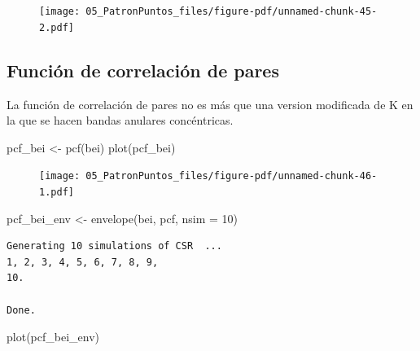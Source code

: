 \documentclass[
  letterpaper,
  DIV=11,
  numbers=noendperiod]{scrreprt}
\newenvironment{Shaded}{\begin{snugshade}}{\end{snugshade}}
\newcommand{\AttributeTok}[1]{\textcolor[rgb]{0.40,0.45,0.13}{#1}}
\newcommand{\DecValTok}[1]{\textcolor[rgb]{0.68,0.00,0.00}{#1}}
\newcommand{\FunctionTok}[1]{\textcolor[rgb]{0.28,0.35,0.67}{#1}}
\newcommand{\NormalTok}[1]{\textcolor[rgb]{0.00,0.23,0.31}{#1}}
\newcommand{\OtherTok}[1]{\textcolor[rgb]{0.00,0.23,0.31}{#1}}
\begin{document}
\begin{figure}[H]

{\centering \texttt{[image: 05\_PatronPuntos\_files/figure-pdf/unnamed-chunk-45-2.pdf]}

}

\end{figure}

\hypertarget{funciuxf3n-de-correlaciuxf3n-de-pares}{%
\subsection{Función de correlación de
pares}\label{funciuxf3n-de-correlaciuxf3n-de-pares}}

La función de correlación de pares no es más que una version modificada
de K en la que se hacen bandas anulares concéntricas.

\begin{Shaded}
\begin{Highlighting}[]
\NormalTok{pcf\_bei  }\OtherTok{\textless{}{-}} \FunctionTok{pcf}\NormalTok{(bei)}
\FunctionTok{plot}\NormalTok{(pcf\_bei)}
\end{Highlighting}
\end{Shaded}

\begin{figure}[H]

{\centering \texttt{[image: 05\_PatronPuntos\_files/figure-pdf/unnamed-chunk-46-1.pdf]}

}

\end{figure}

\begin{Shaded}
\begin{Highlighting}[]
\NormalTok{pcf\_bei\_env }\OtherTok{\textless{}{-}} \FunctionTok{envelope}\NormalTok{(bei, pcf, }\AttributeTok{nsim =} \DecValTok{10}\NormalTok{)}
\end{Highlighting}
\end{Shaded}

\begin{verbatim}
Generating 10 simulations of CSR  ...
1, 2, 3, 4, 5, 6, 7, 8, 9, 
10.

Done.
\end{verbatim}

\begin{Shaded}
\begin{Highlighting}[]
\FunctionTok{plot}\NormalTok{(pcf\_bei\_env)}
\end{Highlighting}
\end{Shaded}
\end{document}
